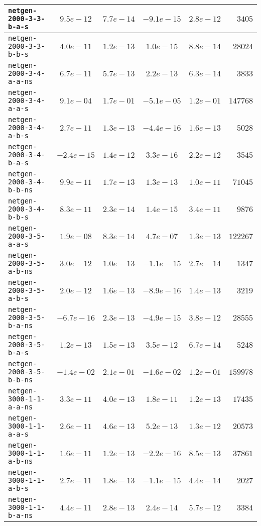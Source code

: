 \begin{center}
\begin{longtable}{|l || c | c | c | c | r|}
\hline
\texttt{netgen-2000-3-3-b-a-s} & $9.5e-12$ & $7.7e-14$ & $-9.1e-15$ & $2.8e-12$ & $3405$ \\
\hline
\texttt{netgen-2000-3-3-b-b-s} & $4.0e-11$ & $1.2e-13$ & $1.0e-15$ & $8.8e-14$ & $28024$ \\
\hline
\texttt{netgen-2000-3-4-a-a-ns} & $6.7e-11$ & $5.7e-13$ & $2.2e-13$ & $6.3e-14$ & $3833$ \\
\hline
\texttt{netgen-2000-3-4-a-a-s} & $9.1e-04$ & $1.7e-01$ & $-5.1e-05$ & $1.2e-01$ & $147768$ \\
\hline
\texttt{netgen-2000-3-4-a-b-s} & $2.7e-11$ & $1.3e-13$ & $-4.4e-16$ & $1.6e-13$ & $5028$ \\
\hline
\texttt{netgen-2000-3-4-b-a-s} & $-2.4e-15$ & $1.4e-12$ & $3.3e-16$ & $2.2e-12$ & $3545$ \\
\hline
\texttt{netgen-2000-3-4-b-b-ns} & $9.9e-11$ & $1.7e-13$ & $1.3e-13$ & $1.0e-11$ & $71045$ \\
\hline
\texttt{netgen-2000-3-4-b-b-s} & $8.3e-11$ & $2.3e-14$ & $1.4e-15$ & $3.4e-11$ & $9876$ \\
\hline
\texttt{netgen-2000-3-5-a-a-s} & $1.9e-08$ & $8.3e-14$ & $4.7e-07$ & $1.3e-13$ & $122267$ \\
\hline
\texttt{netgen-2000-3-5-a-b-ns} & $3.0e-12$ & $1.0e-13$ & $-1.1e-15$ & $2.7e-14$ & $1347$ \\
\hline
\texttt{netgen-2000-3-5-a-b-s} & $2.0e-12$ & $1.6e-13$ & $-8.9e-16$ & $1.4e-13$ & $3219$ \\
\hline
\texttt{netgen-2000-3-5-b-a-ns} & $-6.7e-16$ & $2.3e-13$ & $-4.9e-15$ & $3.8e-12$ & $28555$ \\
\hline
\texttt{netgen-2000-3-5-b-a-s} & $1.2e-13$ & $1.5e-13$ & $3.5e-12$ & $6.7e-14$ & $5248$ \\
\hline
\texttt{netgen-2000-3-5-b-b-ns} & $-1.4e-02$ & $2.1e-01$ & $-1.6e-02$ & $1.2e-01$ & $159978$ \\
\hline
\texttt{netgen-3000-1-1-a-a-ns} & $3.3e-11$ & $4.0e-13$ & $1.8e-11$ & $1.2e-13$ & $17435$ \\
\hline
\texttt{netgen-3000-1-1-a-a-s} & $2.6e-11$ & $4.6e-13$ & $5.2e-13$ & $1.3e-12$ & $20573$ \\
\hline
\texttt{netgen-3000-1-1-a-b-ns} & $1.6e-11$ & $1.2e-13$ & $-2.2e-16$ & $8.5e-13$ & $37861$ \\
\hline
\texttt{netgen-3000-1-1-a-b-s} & $2.7e-11$ & $1.8e-13$ & $-1.1e-15$ & $4.4e-14$ & $2027$ \\
\hline
\texttt{netgen-3000-1-1-b-a-ns} & $4.4e-11$ & $2.8e-13$ & $2.4e-14$ & $5.7e-12$ & $3384$ \\

\end{longtable}
\end{center}
